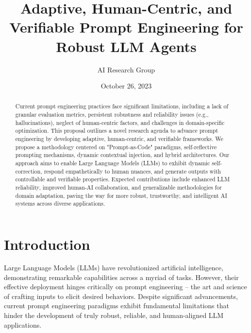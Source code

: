 \documentclass{article}
\title{Adaptive, Human-Centric, and Verifiable Prompt Engineering for Robust LLM Agents}
\author{AI Research Group} %
\date{October 26, 2023} %
\begin{document}
\maketitle

\begin{abstract}
Current prompt engineering practices face significant limitations, including a lack of granular evaluation metrics, persistent robustness and reliability issues (e.g., hallucinations), neglect of human-centric factors, and challenges in domain-specific optimization. This proposal outlines a novel research agenda to advance prompt engineering by developing adaptive, human-centric, and verifiable frameworks. We propose a methodology centered on "Prompt-as-Code" paradigms, self-reflective prompting mechanisms, dynamic contextual injection, and hybrid architectures. Our approach aims to enable Large Language Models (LLMs) to exhibit dynamic self-correction, respond empathetically to human nuances, and generate outputs with controllable and verifiable properties. Expected contributions include enhanced LLM reliability, improved human-AI collaboration, and generalizable methodologies for domain adaptation, paving the way for more robust, trustworthy, and intelligent AI systems across diverse applications.
\end{abstract}

\section{Introduction}

Large Language Models (LLMs) have revolutionized artificial intelligence, demonstrating remarkable capabilities across a myriad of tasks. However, their effective deployment hinges critically on prompt engineering – the art and science of crafting inputs to elicit desired behaviors. Despite significant advancements, current prompt engineering paradigms exhibit fundamental limitations that hinder the development of truly robust, reliable, and human-aligned LLM applications.
\end{document}
